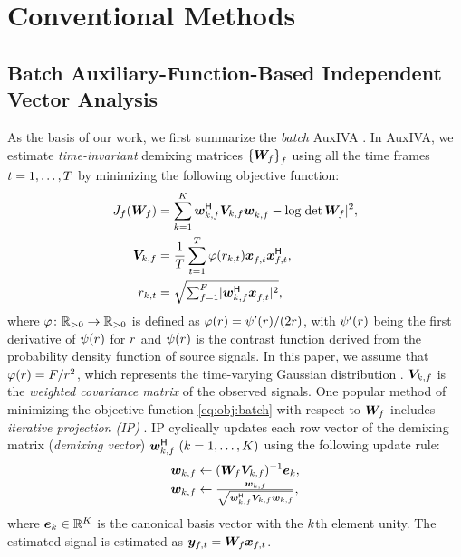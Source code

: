 \documentclass[sip,biber]{now-journal}
\begin{document}
\section{Conventional Methods}\label{sec:conventional}

\subsection{Batch Auxiliary-Function-Based Independent Vector Analysis}\label{subsec:iva}
As the basis of our work, we first summarize the \emph{batch} AuxIVA \cite{Ono:2011:WASPAA}.
In AuxIVA, we estimate \emph{time-invariant} demixing matrices ${\{\bm{W} _{f}\}} _{f}$ using all the time frames $t = 1, \dots, T$ by minimizing the following objective function:
\begin{align}
  J _{\freq}(\Demix _{\freq}) &= \sum _{\src = 1} ^{\Src} \demix _{\src,\freq} ^{\hermite} \cov _{\src,\freq} \demix _{\src,\freq} ^{\nohermite} - \logdet{\Demix _{\freq}} ^2, \label{eq:obj:batch} \\
  \cov _{\src,\freq} &= \frac{1}{\Tframe} \sum _{\tframe = 1} ^{\Tframe} \weight(\var _{\src,\tframe}) \Obs _{\ft} ^{\nohermite} \Obs _{\ft} ^{\hermite}, \label{eq:cov:batch} \\
  \var _{\src,\tframe} &= \textstyle\sqrt{\sum _{\freq=1} ^{\Freq} \lvert \demix ^{\hermite} _{\src,\freq} \Obs ^{\nohermite}_{\ft} \rvert ^2} \label{eq:var:batch},
\end{align}
where
$\varphi\colon \mathbb{R} _{>0} \to \mathbb{R} _{>0}$ is defined as $\varphi(r) = \psi ' (r)/(2 r)$, with $\psi '(r)$ being the first derivative of $\psi (r)$ for $r$
and $\psi(r)$ is the contrast function derived from the probability density function of source signals.
In this paper, we assume that $\varphi (r) = F/r ^2$, which represents the time-varying Gaussian distribution \cite{Ono:2012:APSIPA}.
$\bm{V} _{k,f}$ is the \emph{weighted covariance matrix} of the observed signals.
One popular method of minimizing the objective function \eqref{eq:obj:batch} with respect to $\bm{W} _{f}$ includes \emph{iterative projection (IP)} \cite{Ono:2011:WASPAA}.
IP cyclically updates each row vector of the demixing matrix (\emph{demixing vector}) $\bm{w} _{k,f} ^{\mathsf{H}}\; (k = 1, \dots, K)$ using the following update rule:
\begin{align}
  \bm{w} _{k,f} &\gets (\bm{W} _{f} \bm{V} _{k,f}) ^{-1} \bm{e} _{k} \label{eq:ip:proj}, \\
  \bm{w} _{k,f} &\gets \tfrac{{\bm{w} _{k,f}}}{{\sqrt{\bm{w} _{k,f} ^{\mathsf{H}} \bm{V} _{k,f} \bm{w} _{k,f}}}} \label{eq:ip:norm},
\end{align}
where $\bm{e} _{k} \in \mathbb{R} ^{K}$ is the canonical basis vector with the $k$th element unity.
The estimated signal is estimated as $\Est _{\ft} = \Demix _{\freq} \Obs _{\ft}$.
\end{document}
